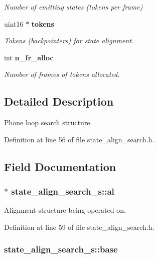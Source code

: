 \begin{DoxyCompactItemize}
\begin{DoxyCompactList}\small\item\em Number of emitting states (tokens per frame) \end{DoxyCompactList}\item 
uint16 $\ast$ {\bf tokens}
\begin{DoxyCompactList}\small\item\em Tokens (backpointers) for state alignment. \end{DoxyCompactList}\item 
int {\bf n\+\_\+fr\+\_\+alloc}
\begin{DoxyCompactList}\small\item\em Number of frames of tokens allocated. \end{DoxyCompactList}\end{DoxyCompactItemize}


\subsection{Detailed Description}
Phone loop search structure. 

Definition at line 56 of file state\+\_\+align\+\_\+search.\+h.



\subsection{Field Documentation}
\subsubsection[{al}]{$\ast$ state\+\_\+align\+\_\+search\+\_\+s\+::al}\label{structstate__align__search__s_a47b9b509c7416f8952ee452d8ce7dda6}


Alignment structure being operated on. 



Definition at line 59 of file state\+\_\+align\+\_\+search.\+h.

\subsubsection[{base}]{ state\+\_\+align\+\_\+search\+\_\+s\+::base}\label{structstate__align__search__s_ab2a596d687e113c88a271d1397b8d9c5}


